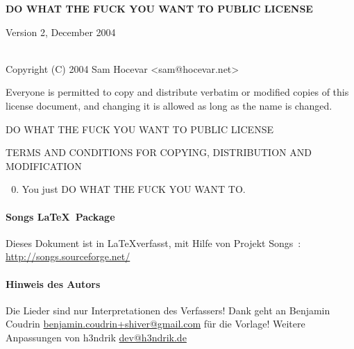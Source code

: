 \begin{center} 
  \textbf{\LARGE{DO WHAT THE FUCK YOU WANT TO PUBLIC LICENSE}}

    Version 2, December 2004

~\\

Copyright (C) 2004 Sam Hocevar <sam@hocevar.net> 
\end{center}
\vspace{1cm}

\begin{lblock}
   Everyone is permitted to copy and distribute verbatim or modified 
 copies of this license document, and changing it is allowed as long 
 as the name is changed. 
\end{lblock}
\begin{lblock}
\centering

DO WHAT THE FUCK YOU WANT TO PUBLIC LICENSE 

TERMS AND CONDITIONS FOR COPYING, DISTRIBUTION AND MODIFICATION

\begin{enumerate}
\setcounter{enumi}{-1}
\item You just DO WHAT THE FUCK YOU WANT TO.
\end{enumerate}
\end{lblock}
\paragraph{Songs \LaTeX~Package}
Dieses Dokument ist in \LaTeX verfasst, mit Hilfe von Projekt Songs~:
\url{http://songs.sourceforge.net/}

\paragraph{Hinweis des Autors}
Die Lieder sind nur Interpretationen des Verfassers!
Dank geht an Benjamin Coudrin \url{benjamin.coudrin+shiver@gmail.com} f\"ur
die Vorlage! Weitere Anpassungen von h3ndrik \url{dev@h3ndrik.de}

